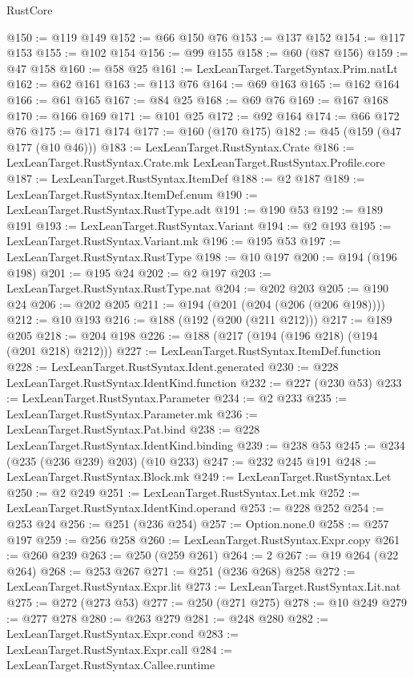 \begin{lexlean}{RustCore}
\begin{coremodule}
@150 := @119 @149
@152 := @66 @150 @76
@153 := @137 @152
@154 := @117 @153
@155 := @102 @154
@156 := @99 @155
@158 := @60 (@87 @156)
@159 := @47 @158
@160 := @58 @25
@161 := LexLeanTarget.TargetSyntax.Prim.natLt
@162 := @62 @161
@163 := @113 @76
@164 := @69 @163
@165 := @162 @164
@166 := @61 @165
@167 := @84 @25
@168 := @69 @76
@169 := @167 @168
@170 := @166 @169
@171 := @101 @25
@172 := @92 @164
@174 := @66 @172 @76
@175 := @171 @174
@177 := @160 (@170 @175)
@182 := @45 (@159 (@47 @177 (@10 @46)))
@183 := LexLeanTarget.RustSyntax.Crate
@186 := LexLeanTarget.RustSyntax.Crate.mk LexLeanTarget.RustSyntax.Profile.core
@187 := LexLeanTarget.RustSyntax.ItemDef
@188 := @2 @187
@189 := LexLeanTarget.RustSyntax.ItemDef.enum
@190 := LexLeanTarget.RustSyntax.RustType.adt
@191 := @190 @53
@192 := @189 @191
@193 := LexLeanTarget.RustSyntax.Variant
@194 := @2 @193
@195 := LexLeanTarget.RustSyntax.Variant.mk
@196 := @195 @53
@197 := LexLeanTarget.RustSyntax.RustType
@198 := @10 @197
@200 := @194 (@196 @198)
@201 := @195 @24
@202 := @2 @197
@203 := LexLeanTarget.RustSyntax.RustType.nat
@204 := @202 @203
@205 := @190 @24
@206 := @202 @205
@211 := @194 (@201 (@204 (@206 (@206 @198))))
@212 := @10 @193
@216 := @188 (@192 (@200 (@211 @212)))
@217 := @189 @205
@218 := @204 @198
@226 := @188 (@217 (@194 (@196 @218) (@194 (@201 @218) @212)))
@227 := LexLeanTarget.RustSyntax.ItemDef.function
@228 := LexLeanTarget.RustSyntax.Ident.generated
@230 := @228 LexLeanTarget.RustSyntax.IdentKind.function
@232 := @227 (@230 @53)
@233 := LexLeanTarget.RustSyntax.Parameter
@234 := @2 @233
@235 := LexLeanTarget.RustSyntax.Parameter.mk
@236 := LexLeanTarget.RustSyntax.Pat.bind
@238 := @228 LexLeanTarget.RustSyntax.IdentKind.binding
@239 := @238 @53
@245 := @234 (@235 (@236 @239) @203) (@10 @233)
@247 := @232 @245 @191
@248 := LexLeanTarget.RustSyntax.Block.mk
@249 := LexLeanTarget.RustSyntax.Let
@250 := @2 @249
@251 := LexLeanTarget.RustSyntax.Let.mk
@252 := LexLeanTarget.RustSyntax.IdentKind.operand
@253 := @228 @252
@254 := @253 @24
@256 := @251 (@236 @254)
@257 := Option.none.{0}
@258 := @257 @197
@259 := @256 @258
@260 := LexLeanTarget.RustSyntax.Expr.copy
@261 := @260 @239
@263 := @250 (@259 @261)
@264 := 2
@267 := @19 @264 (@22 @264)
@268 := @253 @267
@271 := @251 (@236 @268) @258
@272 := LexLeanTarget.RustSyntax.Expr.lit
@273 := LexLeanTarget.RustSyntax.Lit.nat
@275 := @272 (@273 @53)
@277 := @250 (@271 @275)
@278 := @10 @249
@279 := @277 @278
@280 := @263 @279
@281 := @248 @280
@282 := LexLeanTarget.RustSyntax.Expr.cond
@283 := LexLeanTarget.RustSyntax.Expr.call
@284 := LexLeanTarget.RustSyntax.Callee.runtime

\end{coremodule}
\end{lexlean}
